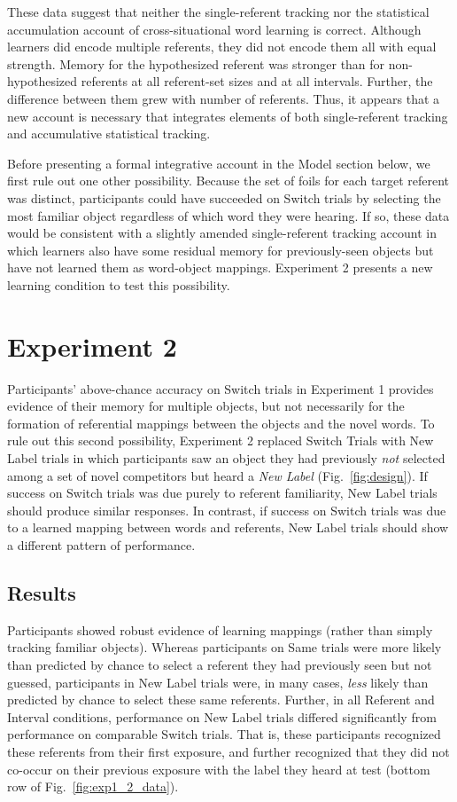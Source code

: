 \documentclass{pnastwo}
\begin{document}
\begin{article}
These data suggest that neither the single-referent tracking nor the statistical accumulation account of cross-situational word learning is correct. Although learners did encode multiple referents, they did not encode them all with equal strength. Memory for the hypothesized referent was stronger than for non-hypothesized referents at all referent-set sizes and at all intervals. Further, the difference between them grew with number of referents. Thus, it appears that a new account is necessary that integrates elements of both single-referent tracking and accumulative statistical tracking.

Before presenting a formal integrative account in the Model section below, we first rule out one other possibility. Because the set of foils for each target referent was distinct, participants could have succeeded on Switch trials by selecting the most familiar object regardless of which word they were hearing. If so, these data would be consistent with a slightly amended single-referent tracking account in which learners also have some residual memory for previously-seen objects but have not learned them as word-object mappings. Experiment 2 presents a new learning condition to test this possibility.

\section{Experiment 2}

Participants' above-chance accuracy on Switch trials in Experiment 1 provides evidence of their memory for multiple objects, but not necessarily for the formation of referential mappings between the objects and the novel words. To rule out this second possibility, Experiment 2 replaced Switch Trials with New Label trials in which participants saw an object they had previously \emph{not} selected among a set of novel competitors but heard a \emph{New Label} (Fig.~\ref{fig:design}). If success on Switch trials was due purely to referent familiarity, New Label trials should produce similar responses. In contrast, if success on Switch trials was due to a learned mapping between words and referents, New Label trials should show a different pattern of performance.

\subsection{Results}

Participants showed robust evidence of learning mappings (rather than simply tracking familiar objects). Whereas participants on Same trials were more likely than predicted by chance to select a referent they had previously seen but not guessed, participants in New Label trials were, in many cases, \emph{less} likely than predicted by chance to select these same referents. Further, in all Referent and Interval conditions, performance on New Label trials differed significantly from performance on comparable Switch trials. That is, these participants recognized these referents from their first exposure, and further recognized that they did not co-occur on their previous exposure with the label they heard at test (bottom row of Fig.~\ref{fig:exp1_2_data}).


\end{article}
\end{document}
